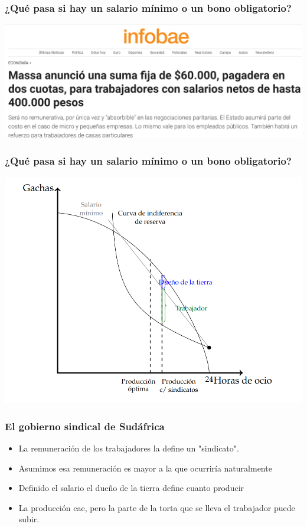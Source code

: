 \documentclass{beamer}
\begin{document}
\begin{frame}
\frametitle{¿Qué pasa si hay un salario mínimo o un bono obligatorio?}
\centering
\includegraphics[scale=0.33]{../Figures/InstitucionesBono.png}
\end{frame}

\begin{frame}
\frametitle{¿Qué pasa si hay un salario mínimo o un bono obligatorio?}
\centering
\includegraphics[scale=0.8]{../Figures/Salariominimo.png}
\end{frame}

\begin{frame}
\frametitle{El gobierno sindical de Sudáfrica}
\begin{itemize}
    \item La remuneración de los trabajadores la define un "sindicato". 
    \item  Asumimos esa remuneración es mayor a la que ocurriría naturalmente
    \item Definido el salario el dueño de la tierra define cuanto producir
    \item  La producción cae, pero la parte de la torta que se lleva el trabajador puede subir. 
\end{itemize}
\end{frame}
\end{document}
